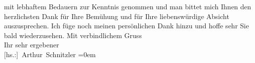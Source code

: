 \begin{ledgroupsized}[t]{13cm}
                    mit lebhaftem Bedauern zur Kenntnis genommen und man bittet mich Ihnen den
                    herzlichsten Dank für Ihre Bemühung und für Ihre liebenswürdige Absicht
                    auszusprechen.\pend
           \pstart
           Ich füge noch meinen persönlichen Dank hinzu und hoffe sehr Sie bald
                    wiederzusehen.\pend
           \pstart
           Mit verbindlichem Gruss{\\[\baselineskip]}Ihr sehr ergebener{\\[\baselineskip]}\spacefill\mbox{{[}hs.:{]} Arthur Schnitzler}\pend
           \leftskip=0em{}\endnumbering{}\end{ledgroupsized}  \newcommand{\dateiname}{L02358}\newcommand{\titel}{Arthur Schnitzler an Robert Adam, 20. 11. 1920}\newcommand{\editorInnen}{Martin Anton Müller und Gerd-Hermann Susen}
      